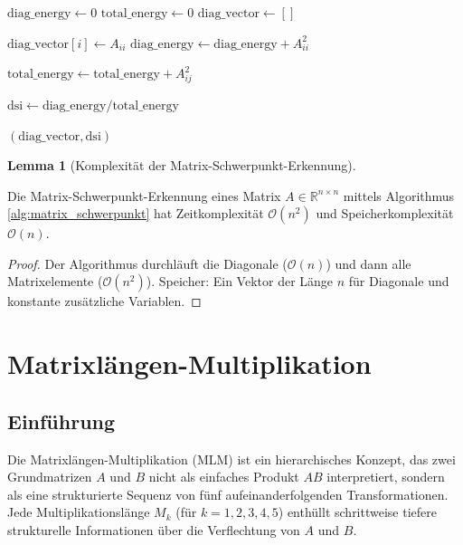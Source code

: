 \documentclass[a4paper,12pt]{article}
\theoremstyle{definition}
\newtheorem{lemma}{Lemma}
\begin{document}
\begin{algorithm}[h]
\caption{Matrix-Schwerpunkt-Erkennung}
\label{alg:matrix_schwerpunkt}
\begin{algorithmic}[1]
	\State $\text{diag\_energy} \leftarrow 0$
	\State $\text{total\_energy} \leftarrow 0$
	\State $\text{diag\_vector} \leftarrow []$
	
		\State $\text{diag\_vector}[i] \leftarrow A_{ii}$
		\State $\text{diag\_energy} \leftarrow \text{diag\_energy} + A_{ii}^2$
	\EndFor
	
			\State $\text{total\_energy} \leftarrow \text{total\_energy} + A_{ij}^2$
		\EndFor
	\EndFor
	
	\State $\text{dsi} \leftarrow \text{diag\_energy} / \text{total\_energy}$
	
	\State \Return $(\text{diag\_vector}, \text{dsi})$
\EndProcedure
\end{algorithmic}
\end{algorithm}

\begin{lemma}[Komplexität der Matrix-Schwerpunkt-Erkennung]
\label{lem:komplexitaet_matrix}

Die Matrix-Schwerpunkt-Erkennung eines Matrix $A \in \mathbb{R}^{n \times n}$ mittels Algorithmus \ref{alg:matrix_schwerpunkt} hat Zeitkomplexität $\mathcal{O}(n^2)$ und Speicherkomplexität $\mathcal{O}(n)$.

\begin{proof}
Der Algorithmus durchläuft die Diagonale ($\mathcal{O}(n)$) und dann alle Matrixelemente ($\mathcal{O}(n^2)$). Speicher: Ein Vektor der Länge $n$ für Diagonale und konstante zusätzliche Variablen.
\end{proof}
\end{lemma}

\section{Matrixlängen-Multiplikation}

\subsection{Einführung}

Die Matrixlängen-Multiplikation (MLM) ist ein hierarchisches Konzept, das zwei Grundmatrizen $A$ und $B$ nicht als einfaches Produkt $AB$ interpretiert, sondern als eine strukturierte Sequenz von fünf aufeinanderfolgenden Transformationen. Jede Multiplikationslänge $M_k$ (für $k = 1, 2, 3, 4, 5$) enthüllt schrittweise tiefere strukturelle Informationen über die Verflechtung von $A$ und $B$.
\end{document}
